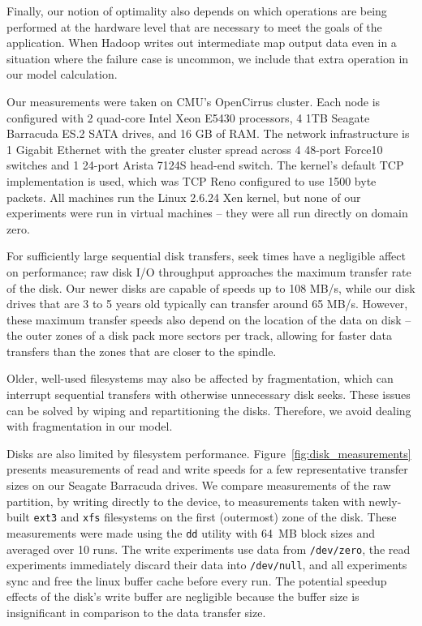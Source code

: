 Finally, our notion of optimality also depends on which operations are
being performed at the hardware level that are necessary to meet the
goals of the application.  When Hadoop writes out intermediate map
output data even in a situation where the failure case is uncommon, we
include that extra operation in our model calculation.

 Our measurements were taken on
CMU's OpenCirrus cluster.  Each node is configured with 2 quad-core
Intel Xeon E5430 processors, 4 1TB Seagate Barracuda ES.2 SATA drives,
and 16 GB of RAM.  The network infrastructure is 1 Gigabit Ethernet
with the greater cluster spread across 4 48-port Force10 switches and
1 24-port Arista 7124S head-end switch.  The kernel's default TCP
implementation is used, which was TCP Reno configured to use 1500 byte
packets. All machines run the Linux 2.6.24 Xen kernel, but none of our
experiments were run in virtual machines -- they were all run directly
on domain zero.

 For sufficiently large sequential disk
transfers, seek times have a negligible affect on performance; raw
disk I/O throughput approaches the maximum transfer rate of the disk.
Our newer disks are capable of speeds up to 108 MB/s, while our disk
drives that are 3 to 5 years old typically can transfer around 65
MB/s.  However, these maximum transfer speeds also depend on the
location of the data on disk -- the outer zones of a disk pack more
sectors per track, allowing for faster data transfers than the zones
that are closer to the spindle.

Older, well-used filesystems may also be affected by fragmentation,
which can interrupt sequential transfers with otherwise unnecessary
disk seeks.  These issues can be solved by wiping and repartitioning
the disks.  Therefore, we avoid dealing with fragmentation in our
model.

Disks are also limited by filesystem performance.
Figure~\ref{fig:disk_measurements} presents measurements of read and
write speeds for a few representative transfer sizes on our Seagate
Barracuda drives.  We compare measurements of the raw partition, by
writing directly to the device, to measurements taken with newly-built
\texttt{ext3} and \texttt{xfs} filesystems on the first (outermost)
zone of the disk.  These measurements were made using the \texttt{dd}
utility with 64~MB block sizes and averaged over 10 runs.  The write
experiments use data from \texttt{/dev/zero}, the read experiments
immediately discard their data into \texttt{/dev/null}, and all
experiments sync and free the linux buffer cache before every run.
The potential speedup effects of the disk's write buffer are
negligible because the buffer size is insignificant in comparison to
the data transfer size.

